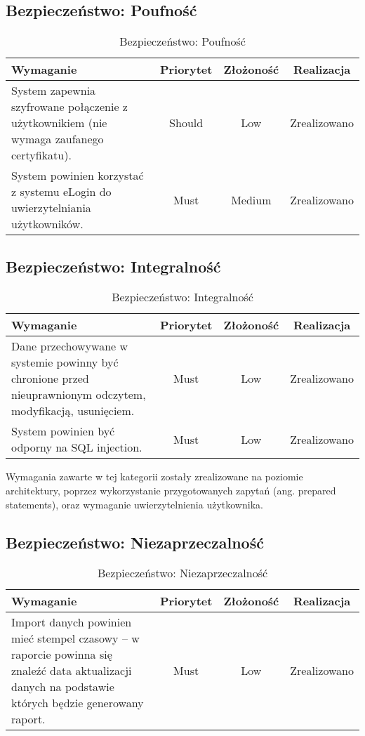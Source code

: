 \subsection{Bezpieczeństwo: Poufność}

\begin{table}[H]
\centering
\begin{tabular}{ | p{8cm} | c | c | c | }
\hline
\textbf{Wymaganie} & \textbf{Priorytet} & \textbf{Złożoność} & \textbf{Realizacja} \\ \hline
System zapewnia szyfrowane połączenie z użytkownikiem (nie wymaga zaufanego certyfikatu). 
 & Should & Low & Zrealizowano \\ \hline
System powinien korzystać z systemu eLogin do uwierzytelniania użytkowników. & Must & Medium & Zrealizowano \\ \hline
\end{tabular}
\caption{Bezpieczeństwo: Poufność}\label{tab:reqs}
\end{table}

\subsection{Bezpieczeństwo: Integralność}

\begin{table}[H]
\centering
\begin{tabular}{ | p{8cm} | c | c | c | }
\hline
\textbf{Wymaganie} & \textbf{Priorytet} & \textbf{Złożoność} & \textbf{Realizacja} \\ \hline
Dane przechowywane w systemie powinny być chronione przed nieuprawnionym odczytem, modyfikacją, usunięciem.
 & Must & Low & Zrealizowano \\ \hline
System powinien być odporny na SQL injection. & Must & Low & Zrealizowano \\ \hline
\end{tabular}
\caption{Bezpieczeństwo: Integralność}\label{tab:reqs}
\end{table}

Wymagania zawarte w tej kategorii zostały zrealizowane na poziomie architektury, poprzez wykorzystanie przygotowanych zapytań (ang. prepared statements), oraz wymaganie uwierzytelnienia użytkownika.

\subsection{Bezpieczeństwo: Niezaprzeczalność}

\begin{table}[H]
\centering
\begin{tabular}{ | p{8cm} | c | c | c | }
\hline
\textbf{Wymaganie} & \textbf{Priorytet} & \textbf{Złożoność} & \textbf{Realizacja} \\ \hline
Import danych powinien mieć stempel czasowy – w raporcie powinna się znaleźć data aktualizacji danych na podstawie których będzie generowany raport.
 & Must & Low & Zrealizowano \\ \hline
\end{tabular}
\caption{Bezpieczeństwo: Niezaprzeczalność}\label{tab:reqs}
\end{table}


